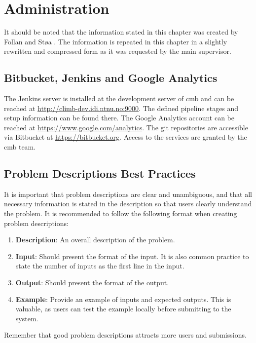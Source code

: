 \chapter{Administration}
\label{apdx:problems}
It should be noted that the information stated in this chapter was created by Follan and Støa \cite{mt:T&S}. The information is repeated in this chapter in a slightly rewritten and compressed form as it was requested by the main supervisor.

\section{Bitbucket, Jenkins and Google Analytics}
The Jenkins server is installed at the development server of \gls{cmb} and can be reached at \url{http://climb-dev.idi.ntnu.no:9000}. The defined pipeline stages and setup information can be found there. The Google Analytics account can be reached at \url{https://www.google.com/analytics}. The git repositories are accessible via Bitbucket at \url{https://bitbucket.org}. Access to the services are granted by the \gls{cmb} team.

\section{Problem Descriptions Best Practices}
It is important that problem descriptions are clear and unambiguous, and that all necessary information is stated in the description so that users clearly understand the problem. It is recommended to follow the following format when creating problem descriptions:
\begin{enumerate}
    \item \textbf{Description}: An overall description of the problem.
    \item \textbf{Input}: Should present the format of the input. It is also common practice to state the number of inputs as the first line in the input.
    \item \textbf{Output}: Should present the format of the output.
    \item \textbf{Example}: Provide an example of inputs and expected outputs. This is valuable, as users can test the example locally before submitting to the system.
\end{enumerate}
Remember that good problem descriptions attracts more users and submissions.

